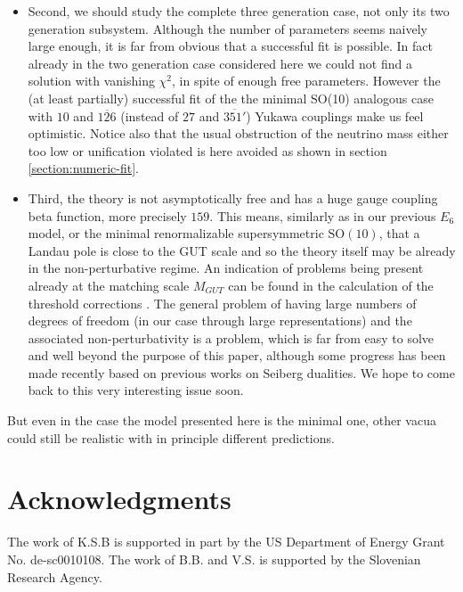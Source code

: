 \documentclass[a4paper,12pt]{article}
\def\SO{\mathrm{SO}}
\begin{document}
\begin{itemize}
\item
Second, we should study the complete three generation case, not only its two generation subsystem. Although
the number of parameters seems naively large enough, it is far from obvious that a successful fit is possible.
In fact already in the two generation case considered here we could not find a solution with vanishing $\chi^2$,
in spite of enough free parameters. However the  (at least partially) successful fit of the the minimal
SO(10) analogous case \cite{Babu:1992ia,Bajc:2001fe,Fukuyama:2002ch,Bajc:2002iw,Goh:2003sy,Goh:2003hf,
Bertolini:2004eq,Babu:2005ia,Bertolini:2006pe,Bajc:2008dc,Joshipura:2011nn,Altarelli:2013aqa,Dueck:2013gca}
with $10$ and $\overline{126}$ (instead of $27$ and $\overline{351'}$) Yukawa couplings make us feel optimistic.
Notice also that the usual obstruction of the neutrino mass either too low or unification violated
\cite{Aulakh:2005bd,Bajc:2005qe,Aulakh:2005mw,Bertolini:2006pe} is here avoided as shown in section
\ref{section:numeric-fit}.

\item
Third, the theory is not asymptotically free and has a huge gauge coupling beta function, more precisely $159$. This means,
similarly as in our previous $E_6$ model, or the minimal renormalizable supersymmetric $\SO(10)$, that a Landau pole
is close to the GUT scale and so the theory itself may be already in the non-perturbative regime. An indication
of problems being present already at the matching scale $M_{GUT}$ can be found in the calculation of the threshold corrections \cite{Aulakh:2011at,Aulakh:2013lxa}. The general problem of having large numbers of degrees of freedom (in our case through large representations) and the associated non-perturbativity is a problem, which is far from easy
to solve and well beyond the purpose of this paper, although some progress has been made recently
\cite{Abel:2008tx,Abel:2009bj} based on previous works on Seiberg dualities. We hope to come back to this
very interesting issue soon.

\end{itemize}

But even in the case the model presented here is the minimal one, other vacua could still be realistic
with in principle different predictions.

\section*{Acknowledgments}
The work of K.S.B is supported in part by the US Department of Energy Grant No. de-sc0010108.
The work of B.B. and V.S. is supported by the Slovenian Research Agency.
\end{document}
